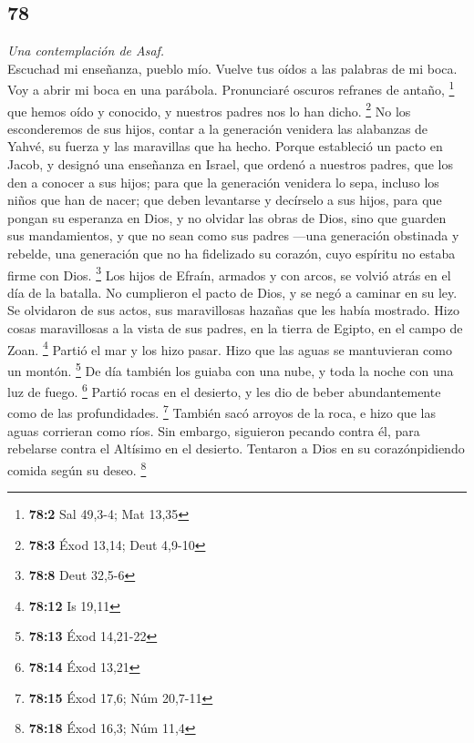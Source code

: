 \begin{paracol}{2}
\hypertarget{section-154}{%
\section{78}\label{section-154}}

\emph{Una contemplación de Asaf.}\\
 Escuchad mi enseñanza, pueblo mío. Vuelve tus oídos a las
palabras de mi boca.  Voy a abrir mi boca en una parábola.
Pronunciaré oscuros refranes de antaño, \footnote{\textbf{78:2} Sal
  49,3-4; Mat 13,35}  que hemos oído y conocido, y
nuestros padres nos lo han dicho. \footnote{\textbf{78:3} Éxod 13,14;
  Deut 4,9-10}  No los esconderemos de sus hijos, contar a
la generación venidera las alabanzas de Yahvé, su fuerza y las
maravillas que ha hecho.  Porque estableció un pacto en
Jacob, y designó una enseñanza en Israel, que ordenó a nuestros padres,
que los den a conocer a sus hijos;  para que la generación
venidera lo sepa, incluso los niños que han de nacer; que deben
levantarse y decírselo a sus hijos,  para que pongan su
esperanza en Dios, y no olvidar las obras de Dios, sino que guarden sus
mandamientos,  y que no sean como sus padres ---una
generación obstinada y rebelde, una generación que no ha fidelizado su
corazón, cuyo espíritu no estaba firme con Dios. \footnote{\textbf{78:8}
  Deut 32,5-6}  Los hijos de Efraín, armados y con arcos,
se volvió atrás en el día de la batalla.  No cumplieron
el pacto de Dios, y se negó a caminar en su ley.  Se
olvidaron de sus actos, sus maravillosas hazañas que les había mostrado.
 Hizo cosas maravillosas a la vista de sus padres, en la
tierra de Egipto, en el campo de Zoan. \footnote{\textbf{78:12} Is 19,11}
 Partió el mar y los hizo pasar. Hizo que las aguas se
mantuvieran como un montón. \footnote{\textbf{78:13} Éxod 14,21-22}
 De día también los guiaba con una nube, y toda la noche
con una luz de fuego. \footnote{\textbf{78:14} Éxod 13,21}
 Partió rocas en el desierto, y les dio de beber
abundantemente como de las profundidades. \footnote{\textbf{78:15} Éxod
  17,6; Núm 20,7-11}  También sacó arroyos de la roca, e
hizo que las aguas corrieran como ríos.  Sin embargo,
siguieron pecando contra él, para rebelarse contra el Altísimo en el
desierto.  Tentaron a Dios en su corazónpidiendo comida
según su deseo. \footnote{\textbf{78:18} Éxod 16,3; Núm 11,4}

\end{paracol}

